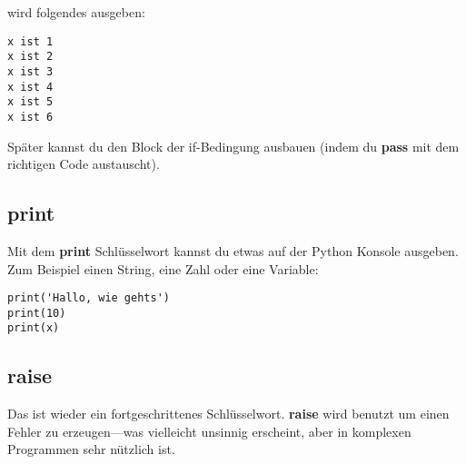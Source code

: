 \noindent
wird folgendes ausgeben:

\begin{Verbatim}[frame=single]
x ist 1
x ist 2
x ist 3
x ist 4
x ist 5
x ist 6
\end{Verbatim}

\noindent
Später kannst du den Block der if-Bedingung ausbauen (indem du \textbf{pass} mit dem richtigen Code austauscht).

\subsection*{print}

Mit dem \textbf{print} Schlüsselwort kannst du etwas auf der Python Konsole ausgeben. Zum Beispiel einen String, eine Zahl oder eine Variable:

\begin{Verbatim}[frame=single]
print('Hallo, wie gehts')
print(10)
print(x)
\end{Verbatim}

\subsection*{raise}

Das ist wieder ein fortgeschrittenes Schlüsselwort. \textbf{raise} wird benutzt um einen Fehler zu erzeugen---was vielleicht unsinnig erscheint, aber in komplexen Programmen sehr nützlich ist.

